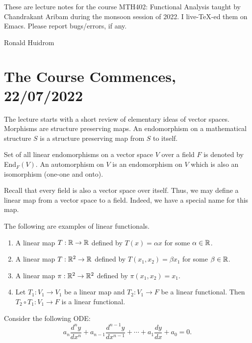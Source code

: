 \documentclass{amsart}
\begin{document}


These are lecture notes for the course MTH402: Functional Analysis taught by Chandrakant Aribam during the monsoon session of 2022. I live-\TeX{}-ed them on Emacs. Please report bugs/errors, if any.

\hfill Ronald Huidrom

\tableofcontents

\section{The Course Commences, 22/07/2022} 

The lecture starts with a short review of elementary ideas of vector spaces. Morphisms are structure preserving maps. An endomorphism on a mathematical structure $S$ is a structure preserving map from $S$ to itself.


Set of all linear endomorphisms on a vector space $V$ over a field $F$ is denoted by End$_F(V)$. An automorphism on $V$ is an endomorphism on $V$ which is also an isomorphism (one-one and onto).

Recall that every field is also a vector space over itself. Thus, we may define a linear map from a vector space to a field. Indeed, we have a special name for this map.


The following are examples of linear functionals.

\begin{enumerate}
\item A linear map $T: \mathbb{R} \to \mathbb{R} $ defined by $T(x) = \alpha x$ for some $\alpha \in \mathbb{R}$. 
\item A linear map $T: \mathbb{R}^2 \to \mathbb{R}$ defined by $T(x_1, x_2) = \beta x_1$ for some $\beta \in \mathbb{R}$. 
\item A linear map $\pi: \mathbb{R}^2 \to \mathbb{R}^2$ defined by $\pi(x_1, x_2) = x_1$. 
\item Let $T_1:V_1 \to V_1$ be a linear map and $T_2: V_1 \to F$ be a linear functional. Then $T_2\circ T_1: V_1 \to F$ is a linear functional. 
\end{enumerate}

Consider the following ODE: 
\begin{equation}
\label{eq:1}
a_n \frac{d^ny}{dx^n} + a_{n-1} \frac{d^{n-1}y}{dx^{n-1}} + \cdots + a_1 \frac{dy}{dx} + a_0 = 0.
\end{equation}
\end{document}
